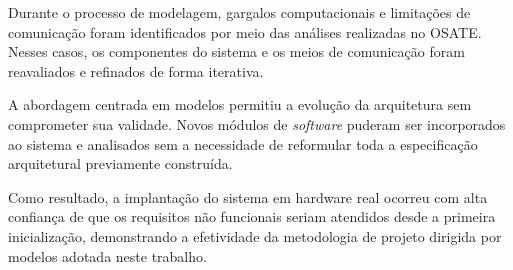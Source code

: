 Durante o processo de modelagem, gargalos computacionais e limitações de comunicação foram identificados por meio das análises realizadas no OSATE. Nesses casos, os componentes do sistema e os meios de comunicação foram reavaliados e refinados de forma iterativa.

A abordagem centrada em modelos permitiu a evolução da arquitetura sem comprometer sua validade. Novos módulos de \textit{software} puderam ser incorporados ao sistema e analisados sem a necessidade de reformular toda a especificação arquitetural previamente construída.

Como resultado, a implantação do sistema em hardware real ocorreu com alta confiança de que os requisitos não funcionais seriam atendidos desde a primeira inicialização, demonstrando a efetividade da metodologia de projeto dirigida por modelos adotada neste trabalho.
